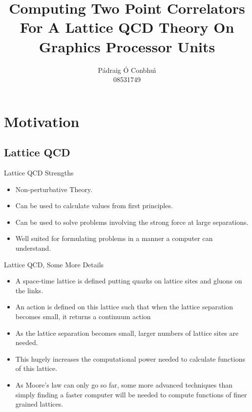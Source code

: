 \documentclass[xcolor=svgnames]{beamer}
\author[P. {\'O} Conbhu{\'\i}]{P{\'a}draig {\'O} Conbhu{\'\i}\\
08531749}
\title[Correlators on a GPU]{Computing Two Point Correlators For A Lattice QCD Theory On Graphics Processor Units}
\institute[TCD]{%
School of Mathematics,\\
Trinity College Dublin\\[1ex]
\texttt{oconbhup@tcd.ie}
}
\begin{document}
\begin{frame}[plain]
  \titlepage
\end{frame}

\begin{frame}[plain]
  \tableofcontents
\end{frame}

\section{Motivation}

\subsection{Lattice QCD}

\begin{frame}{Lattice QCD Strengths}
 \begin{itemize}
  \item Non-perturbative Theory.
  \item Can be used to calculate values from first principles.
  \item Can be used to solve problems involving the strong force at large separations.
  \item Well suited for formulating problems in a manner a computer can understand.
 \end{itemize}
\end{frame}

\begin{frame}{Lattice QCD, Some More Details}
 \begin{itemize}
  \item A space-time lattice is defined putting quarks on lattice sites and gluons on the links.
  \item An action is defined on this lattice such that when the lattice separation becomes small, it returns a continuum action
  \item As the lattice separation becomes small, larger numbers of lattice sites are needed.
  \item This hugely increases the computational power needed to calculate functions of this lattice.
  \item As Moore's law can only go so far, some more advanced techniques than simply finding a faster computer will be needed to compute functions of finer grained lattices.
 \end{itemize}
\end{frame}
\end{document}
